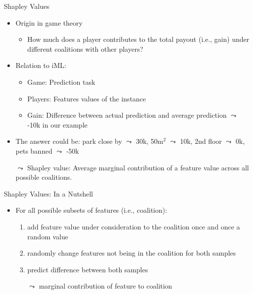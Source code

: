 \documentclass[aspectratio=169]{../latex_main/tntbeamer}  %
\begin{document}
\begin{frame}[c]{Shapley Values}
	
	\begin{itemize}
	    \item Origin in game theory 
	    \begin{itemize}
	        \item How much does a player contributes to the total payout (i.e., gain) under different coalitions with other players?
	    \end{itemize}
	    \pause
	    \item Relation to iML:
	    \begin{itemize}
	        \item Game: Prediction task
	        \item Players: Features values of the instance 
	        \item Gain: Difference between actual prediction and average prediction $\leadsto$ -10k in our example
	    \end{itemize}
    	\pause
    	\smallskip
    	\item The answer could be: park close by $\leadsto$ 30k, 50m$^2$ $\leadsto$ 10k, 2nd floor $\leadsto$ 0k, pets banned $\leadsto$ -50k
    	\pause
    	\smallskip
    	\item[$\leadsto$] Shapley value: Average marginal contribution of a feature value across all possible coalitions.
	\end{itemize}
\end{frame}

\begin{frame}[c]{Shapley Values: In a Nutshell}
	
	\begin{itemize}
	    \item For all possible subsets of features (i.e., coalition):
	    \begin{enumerate}
	        \item add feature value under consideration to the coalition once and once a random value
	        \item randomly change features not being in the coalition for both samples
	        \item predict difference between both samples
	        \item[$\leadsto$] marginal contribution of feature to coalition
	    \end{enumerate}
	    
	 \end{itemize}
\end{frame}
\end{document}
